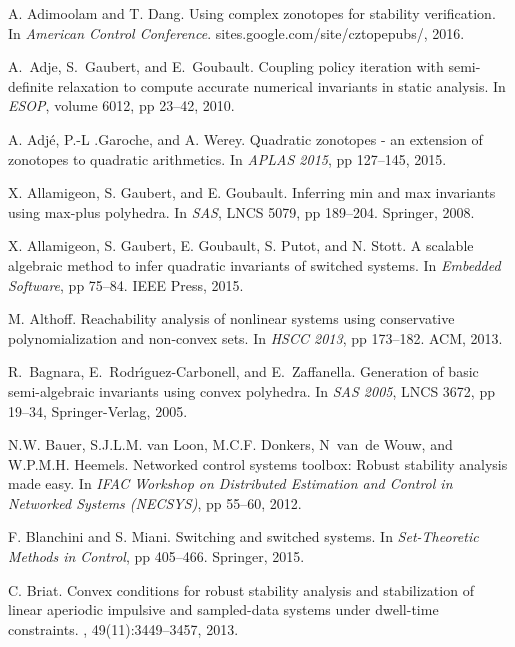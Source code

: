 \documentclass[letterpaper, 10 pt, conference]{ieeeconf}  %
\numberwithin{thm}{section}
\begin{document}
\begin{thebibliography}{10}

A. Adimoolam and T. Dang.
\newblock Using complex zonotopes for stability verification.
\newblock In {\em American Control Conference}.
  sites.google.com/site/cztopepubs/, 2016.

A.~Adje, S.~Gaubert, and E.~Goubault.
\newblock Coupling policy iteration with semi-definite relaxation to compute
  accurate numerical invariants in static analysis.
\newblock In {\em ESOP}, volume 6012, pp 23--42, 2010.

A. Adj{\'{e}}, P.{-}L .Garoche, and A. Werey.
\newblock Quadratic zonotopes - an extension of zonotopes to quadratic
  arithmetics.
\newblock In {\em APLAS 2015}, pp 127--145, 2015.

X. Allamigeon, S. Gaubert, and E. Goubault.
\newblock Inferring min and max invariants using max-plus polyhedra.
\newblock In {\em SAS}, LNCS 5079, pp 189--204.
  {Springer}, 2008.

X. Allamigeon, S. Gaubert, E. Goubault, S. Putot, and
  N. Stott.
\newblock A scalable algebraic method to infer quadratic invariants of switched
  systems.
\newblock In {\em Embedded
  Software}, pp 75--84. IEEE Press, 2015.

M. Althoff.
\newblock Reachability analysis of nonlinear systems using conservative
  polynomialization and non-convex sets.
\newblock In {\em HSCC 2013}, pp 173--182. ACM, 2013.

R.~Bagnara, E.~Rodr{\'\i}guez-Carbonell, and E.~Zaffanella.
\newblock Generation of basic semi-algebraic invariants using convex polyhedra.
\newblock In {\em SAS 2005},
LNCS 3672, pp 19--34, Springer-Verlag, 2005.

N.W. Bauer, S.J.L.M. van Loon, M.C.F. Donkers, N~van~de Wouw, and W.P.M.H.
  Heemels.
\newblock Networked control systems toolbox: Robust stability analysis made
  easy.
\newblock In {\em IFAC Workshop on Distributed Estimation and Control in
  Networked Systems (NECSYS)}, pp 55--60, 2012.

F. Blanchini and S. Miani.
\newblock Switching and switched systems.
\newblock In {\em Set-Theoretic Methods in Control}, pp 405--466. Springer,
  2015.

C. Briat.
\newblock Convex conditions for robust stability analysis and stabilization of
  linear aperiodic impulsive and sampled-data systems under dwell-time
  constraints.
, 49(11):3449--3457, 2013.


\end{thebibliography}
\end{document}
